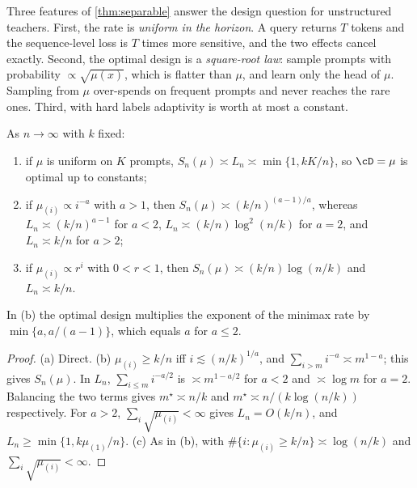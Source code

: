 \noindent
Three features of \cref{thm:separable} answer the design question for unstructured teachers. First,
the rate is \emph{uniform in the horizon}. A query returns $T$ tokens and the sequence-level loss is $T$
times more sensitive, and the two effects cancel exactly. Second, the optimal design is a
\emph{square-root law}: sample prompts with probability $\propto\sqrt{\mu(x)}$, which is flatter than $\mu$,
and learn only the head of $\mu$. Sampling from $\mu$ over-spends on frequent prompts and never reaches
the rare ones. Third, with hard labels adaptivity is worth at most a constant.

\begin{corollary}\label{cor:sep-rates}
\Pv\Ck As $n\to\infty$ with $k$ fixed:
\begin{enumerate}[label=(\alph*),nosep]
\item if $\mu$ is uniform on $K$ prompts, $S_n(\mu)\asymp L_n\asymp\min\{1,kK/n\}$, so $\cD=\mu$ is optimal up to
constants;
\item if $\mu_{(i)}\propto i^{-a}$ with $a>1$, then $S_n(\mu)\asymp(k/n)^{(a-1)/a}$, whereas $L_n\asymp(k/n)^{a-1}$ for
$a<2$, $L_n\asymp(k/n)\log^2(n/k)$ for $a=2$, and $L_n\asymp k/n$ for $a>2$;
\item if $\mu_{(i)}\propto r^i$ with $0<r<1$, then $S_n(\mu)\asymp(k/n)\log(n/k)$ and $L_n\asymp k/n$.
\end{enumerate}
In (b) the optimal design multiplies the exponent of the minimax rate by $\min\{a,a/(a-1)\}$, which
equals $a$ for $a\le2$.
\end{corollary}
\begin{proof}
(a) Direct. (b) $\mu_{(i)}\ge k/n$ iff $i\lesssim(n/k)^{1/a}$, and $\sum_{i>m}i^{-a}\asymp m^{1-a}$; this gives $S_n(\mu)$.
In $L_n$, $\sum_{i\le m}i^{-a/2}$ is $\asymp m^{1-a/2}$ for $a<2$ and $\asymp\log m$ for $a=2$. Balancing the two terms gives
$m^\star\asymp n/k$ and $m^\star\asymp n/(k\log(n/k))$ respectively. For $a>2$, $\sum_i\sqrt{\mu_{(i)}}<\infty$ gives
$L_n=O(k/n)$, and $L_n\ge\min\{1,k\mu_{(1)}/n\}$. (c) As in (b), with $\#\{i:\mu_{(i)}\ge k/n\}\asymp\log(n/k)$ and
$\sum_i\sqrt{\mu_{(i)}}<\infty$.
\end{proof}

